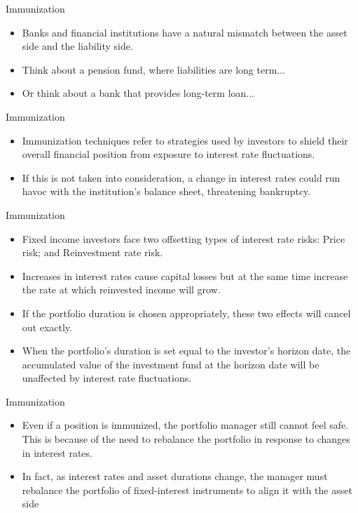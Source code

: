 \documentclass{beamer}
\begin{document}
\begin{frame}{Immunization}
    \begin{itemize}
        \item Banks and financial institutions have a natural mismatch between the asset side and the liability side.
        \item Think about a pension fund, where liabilities are long term...
        \item Or think about a bank that provides long-term 
loan...
    \end{itemize}
\end{frame}

\begin{frame}{Immunization}
    \begin{itemize}
        \item Immunization techniques refer to strategies used by investors to shield their overall financial position from exposure to interest rate fluctuations. 
        \item If this is not taken into consideration, a change in interest rates could run havoc with the institution’s balance sheet, threatening bankruptcy.
    \end{itemize}
\end{frame}

\begin{frame}{Immunization}
    \begin{itemize}
        \item Fixed income investors face two offsetting types of interest rate risks:
            Price risk; and  Reinvestment rate risk.
        \item Increases in interest rates cause capital losses but at the same time increase the rate at which reinvested income will grow.
        \item If the portfolio duration is chosen appropriately, these two effects will cancel out exactly. 
        \item When the portfolio’s duration is set equal to the investor’s horizon date, the accumulated value of the investment fund at the horizon date will be unaffected by interest rate fluctuations.
    \end{itemize}
\end{frame}

\begin{frame}{Immunization}
    \begin{itemize}
        \item Even if a position is immunized, the portfolio manager still cannot feel safe. This is because of the need to rebalance the portfolio in response to changes in interest rates.
        \item In fact, as interest rates and asset durations change, the manager must rebalance the portfolio of fixed-interest instruments to align it with the asset side
    \end{itemize}
\end{frame}
\end{document}
